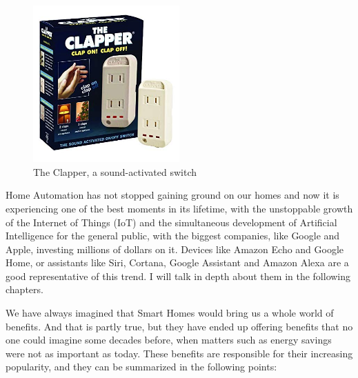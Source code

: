 \begin{figure}
	\centering
	\includegraphics[width=0.5\textwidth]{images/Chapter_02/the-clapper.jpg}
	\caption{The Clapper, a sound-activated switch}
	\label{fig:the-clapper}
\end{figure}

Home Automation has not stopped gaining ground on our homes and now it is experiencing one of the best moments
in its lifetime, with the unstoppable growth of the Internet of Things (IoT) and the simultaneous development of Artificial 
Intelligence for the general public, with the biggest companies, like Google and Apple, investing millions of dollars on it.
Devices like Amazon Echo and Google Home, or assistants like Siri, Cortana, Google Assistant and Amazon Alexa are a 
good representative of this trend. I will talk in depth about them in the following chapters.

We have always imagined that Smart Homes would bring us a whole world of benefits. And that is partly true, but
they have ended up offering benefits that no one could imagine some decades before, when matters such as energy
savings were not as important as today. These benefits are responsible for their increasing popularity, and they can be 
summarized in the following points:

